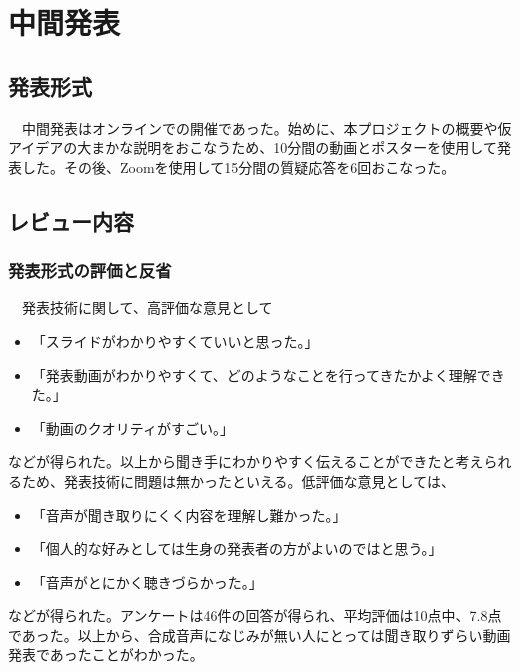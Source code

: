 \chapter{中間発表}

\section{発表形式}
　中間発表はオンラインでの開催であった。始めに、本プロジェクトの概要や仮アイデアの大まかな説明をおこなうため、10分間の動画とポスターを使用して発表した。その後、Zoomを使用して15分間の質疑応答を6回おこなった。

\section{レビュー内容}
\subsection{発表形式の評価と反省}
　発表技術に関して、高評価な意見として
\begin{itemize}
    \item 「スライドがわかりやすくていいと思った。」
    \item 「発表動画がわかりやすくて、どのようなことを行ってきたかよく理解できた。」
    \item 「動画のクオリティがすごい。」
\end{itemize}
などが得られた。以上から聞き手にわかりやすく伝えることができたと考えられるため、発表技術に問題は無かったといえる。低評価な意見としては、
\begin{itemize}
    \item 「音声が聞き取りにくく内容を理解し難かった。」
    \item 「個人的な好みとしては生身の発表者の方がよいのではと思う。」
    \item 「音声がとにかく聴きづらかった。」
\end{itemize}
などが得られた。アンケートは46件の回答が得られ、平均評価は10点中、7.8点であった。以上から、合成音声になじみが無い人にとっては聞き取りずらい動画発表であったことがわかった。

